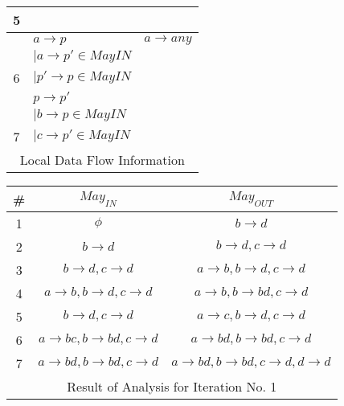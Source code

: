 \documentclass[12pt]{article}
\begin{document}
\begin{enumerate}
{\begin{center}
\begin{tabular}{|c||l|l||}
  5 & & \\ \hline
  & $a\rightarrow p$ & $a\rightarrow any$ \\
  & $| a\rightarrow p' \in MayIN$ & \\ 
  6 & $| p'\rightarrow p \in MayIN$ &  \\ \hline
  & $p \rightarrow p'$ & \\
  & $| b\rightarrow p \in MayIN$& \\ 
  7 & $| c\rightarrow p' \in MayIN$& \\ \hline
\multicolumn{3}{c}{    Local Data Flow Information}
\end{tabular}
\end{center}
\begin{center}
  \renewcommand{\arraystretch}{1.3}
  \hspace*{-25mm}\begin{tabular}{|c||c|c||} \hline
    {\bf \#} & {\bf $May_{IN}$} & {\bf $May_{OUT}$} \\ \hline \hline
    1 & $\phi$ & $b\rightarrow d$\\ \hline
    2 & $b\rightarrow d$ & $b\rightarrow d, c \rightarrow d$ \\ \hline
    3 & $b\rightarrow d, c \rightarrow d$ & $a   \rightarrow b, b\rightarrow d,    c \rightarrow d$ \\ \hline
    4 & $a \rightarrow b, b\rightarrow d,    c \rightarrow d$ & $a \rightarrow b, b\rightarrow bd,    c \rightarrow d$ \\ \hline
    5 & $ b\rightarrow d,    c \rightarrow d$ & $a \rightarrow c, b\rightarrow d,    c \rightarrow d$ \\ \hline
    6 & $a \rightarrow b c, b\rightarrow b d,    c \rightarrow d$ & $a \rightarrow b d, b\rightarrow b d,    c \rightarrow d$ \\ \hline
    7 & $a \rightarrow b d, b\rightarrow b d,    c \rightarrow d$ & $a \rightarrow b d, b\rightarrow b d,    c \rightarrow d, d \rightarrow d$ \\ \hline
    \multicolumn{3}{c}{  Result of Analysis for Iteration No. 1 }
  \end{tabular}
\end{center}

}
\end{enumerate}
\end{document}
